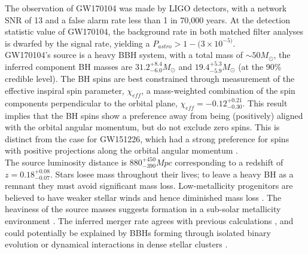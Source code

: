 \documentclass[binding=0.6cm, LaM]{sapthesis}
\begin{document}
	The observation of GW170104 was made by LIGO detectors, 
	with a network SNR of 13 and a false alarm rate less than 1 in 70,000 years.
	At the detection statistic value of GW170104, the background rate in both matched filter 
	analyses is dwarfed by the signal rate, yielding a $P_{astro} > 1 - (3 \times 10^{-5)}$. \\
	GW170104’s source is a heavy BBH system, with a total mass of $\sim50M_\odot$,	
	the inferred component BH masses are $31.2^{+8.4}_{-6.0}M_\odot$ and $19.4^{+5.3} _{-5.9}M_\odot$ (at the 90\% credible level). 
	The BH spins are best constrained through measurement of the effective inspiral spin parameter, $\chi_{eff}$, 
	a mass-weighted combination of the spin components perpendicular to the orbital plane, $\chi_{eff} = −0.12^{+0.21}_{−0.30}$. 
	This result implies that the BH spins show a preference away from being 
	(positively) aligned with the orbital angular momentum, but do not exclude zero spins. 
	This is distinct from the case for GW151226, which had a strong preference 
	for spins with positive projections along the orbital angular momentum \cite{58}. \\
	The source luminosity distance is $880^{+450}_{−390} Mpc$ corresponding to a redshift of $z = 0.18^{+0.08}_{−0.07}$. 
	Stars losee mass throughout their lives; to leave a heavy BH as a remnant 
	they must avoid significant mass loss. 
	Low-metallicity progenitors are believed to have weaker stellar winds and hence diminished mass loss \cite{135}. 
	The heaviness of the source masses suggests formation in a sub-solar metallicity environment \cite{134}. 
	The inferred merger rate agrees with previous calculations \cite{59, 137}, and could potentially be explained 	
	by BBHs forming through isolated binary evolution or dynamical interactions in dense stellar clusters \cite{134}. 
\end{document}
